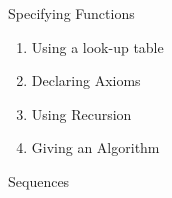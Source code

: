 \documentclass[aspectratio=169]{beamer}
\begin{document}
\begin{frame}{Specifying Functions}
    \begin{enumerate}
        \item Using a look-up table
        \item Declaring Axioms
        \item Using Recursion
        \item Giving an Algorithm
    \end{enumerate}
\end{frame}

\begin{frame}{Sequences}
    
\end{frame}
\end{document}
